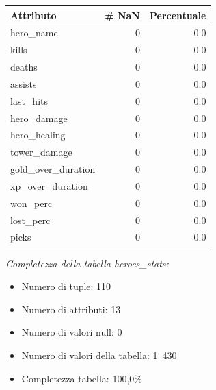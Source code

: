 \documentclass[a4paper,12pt,openany,oneside]{book}
\begin{document}
\begin{table}[!h]
	\scriptsize	
	\centering	
	\begin{tabularx}{0.37\textwidth}{lrr} 
		Attributo      &   \# NaN   &     Percentuale \\
		\midrule
		hero\_name      &       0   &    0.0 \\
		kills   &       0   &    0.0 \\
		deaths       &       0   &    0.0 \\
		assists          &       0   &    0.0 \\
		last\_hits    &       0   &    0.0 \\
		hero\_damage      &      0   &    0.0 \\
		hero\_healing       &    0   &    0.0 \\
		tower\_damage     &  0   &   0.0 \\
		gold\_over\_duration      &   0   &    0.0 \\
		xp\_over\_duration         &       0   &    0.0 \\
		won\_perc        &       0   &    0.0 \\
		lost\_perc        &       0   &    0.0 \\
		picks        &       0   &    0.0 \\
	\end{tabularx}
\end{table}
\textit{Completezza della tabella heroes\_stats:}
\begin{itemize}
	\item Numero di tuple: 110
	\item Numero di attributi: 13
	\item Numero di valori null: 0
	\item Numero di valori della tabella: 1 430
	\item Completezza tabella: 100,0\%
\end{itemize}
\end{document}
